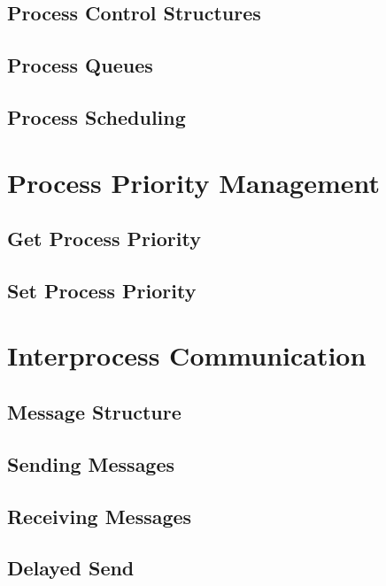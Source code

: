 \documentclass[12pt]{report}
\begin{document}
\subsection{Process Control Structures}


\subsection{Process Queues}


\subsection{Process Scheduling}



\section{Process Priority Management}

\subsection{Get Process Priority}


\subsection{Set Process Priority}



\section{Interprocess Communication}

\subsection{Message Structure}


\subsection{Sending Messages}


\subsection{Receiving Messages}


\subsection{Delayed Send}
\end{document}
